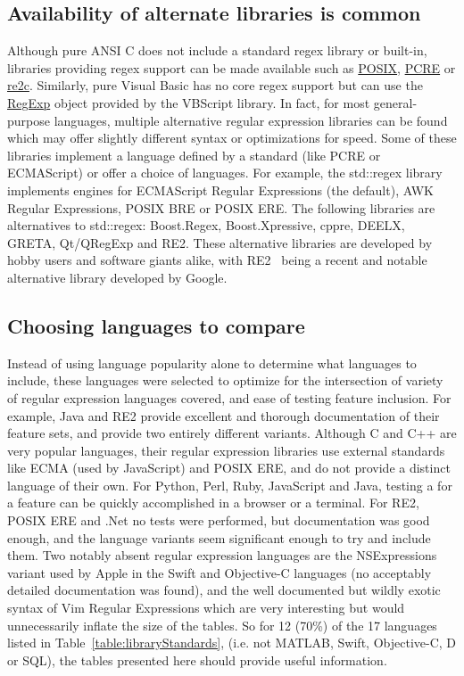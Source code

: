 \subsection*{Availability of alternate libraries is common}
\label{app:alternateLibraries}
Although pure ANSI C does not include a standard regex library or built-in, libraries providing regex support can be made available such as \underline{POSIX}, \underline{PCRE} or \underline{re2c}.  Similarly, pure Visual Basic has no core regex support but can use the \underline{RegExp} object provided by the VBScript library.  In fact, for most general-purpose languages, multiple alternative regular expression libraries can be found which may offer slightly different syntax or optimizations for speed.  Some of these libraries implement a language defined by a standard (like PCRE or ECMAScript) or offer a choice of languages.  For example, the std::regex library implements engines for ECMAScript Regular Expressions (the default), AWK Regular Expressions,  POSIX BRE or POSIX ERE.  The following libraries are alternatives to std::regex: Boost.Regex, Boost.Xpressive, cppre, DEELX, GRETA, Qt/QRegExp and RE2.  These alternative libraries are developed by hobby users and software giants alike, with RE2~ being a recent and notable alternative library developed by Google.

\subsection*{Choosing languages to compare}
\label{app:languagesChosen}
Instead of using language popularity alone to determine what languages to include, these languages were selected to optimize for the intersection of variety of regular expression languages covered, and ease of testing feature inclusion.  For example, Java and RE2 provide excellent and thorough documentation of their feature sets, and provide two entirely different variants.  Although C and C++ are very popular languages, their regular expression libraries use external standards like ECMA (used by JavaScript) and POSIX ERE, and do not provide a distinct language of their own.  For Python, Perl, Ruby, JavaScript and Java, testing a for a feature can be quickly accomplished in a browser or a terminal.  For RE2, POSIX ERE and .Net no tests were performed, but documentation was good enough, and the language variants seem significant enough to try and include them.  Two notably absent regular expression languages are the NSExpressions variant used by Apple in the Swift and Objective-C languages (no acceptably detailed documentation was found), and the well documented but wildly exotic syntax of Vim Regular Expressions which are very interesting but would unnecessarily inflate the size of the tables. So for 12 (70\%) of the 17 languages listed in Table~\ref{table:libraryStandards}, (i.e. not MATLAB, Swift, Objective-C, D or SQL), the tables presented here should provide useful information.

